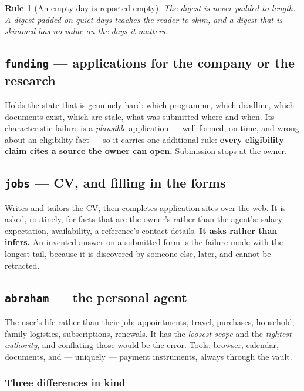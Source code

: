 \documentclass[11pt]{article}
\newtheorem{drule}{Rule}
\newcommand{\code}[1]{\texttt{\small #1}}
\begin{document}
\begin{drule}[An empty day is reported empty]
\label{rule:empty}
The digest is never padded to length. A digest padded on quiet days teaches the reader to skim, and a digest that is skimmed has no value on the days it matters.
\end{drule}

\subsection{\code{funding} --- applications for the company or the research}

Holds the state that is genuinely hard: which programme, which deadline, which documents exist, which are stale, what was submitted where and when. Its characteristic failure is a \emph{plausible} application --- well-formed, on time, and wrong about an eligibility fact --- so it carries one additional rule: \textbf{every eligibility claim cites a source the owner can open.} Submission stops at the owner.

\subsection{\code{jobs} --- CV, and filling in the forms}

Writes and tailors the CV, then completes application sites over the web. It is asked, routinely, for facts that are the owner's rather than the agent's: salary expectation, availability, a reference's contact details. \textbf{It asks rather than infers.} An invented answer on a submitted form is the failure mode with the longest tail, because it is discovered by someone else, later, and cannot be retracted.

\subsection{\code{abraham} --- the personal agent}
\label{sec:abraham}

The user's life rather than their job: appointments, travel, purchases, household, family logistics, subscriptions, renewals. It has the \emph{loosest scope} and the \emph{tightest authority}, and conflating those would be the error. Tools: browser, calendar, documents, and --- uniquely --- payment instruments, always through the vault.

\subsubsection{Three differences in kind}
\end{document}
